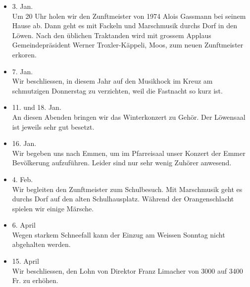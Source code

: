 \begin{multicols}{2}


    \begin{itemize}

        \item[]3. Jan.\\
        Um 20 Uhr holen wir den Zunftmeister von 1974 Alois Gassmann bei seinem
        Hause ab. Dann geht es mit Fackeln und Marschmusik durchs Dorf in den
        Löwen. Nach den üblichen Traktanden wird mit grossem Applaus
        Gemeindepräsident Werner Troxler-Käppeli, Moos, zum neuen Zunftmeister
        erkoren.

        \item[]7. Jan.\\
        Wir beschliessen, in diesem Jahr auf den Musikhock im Kreuz am
        schmutzigen Donnerstag zu verzichten, weil die Fastnacht so kurz ist.

        \item[]11. und 18. Jan.\\
        An diesen Abenden bringen wir das Winterkonzert zu Gehör. Der Löwensaal
        ist jeweils sehr gut besetzt.

        \item[]16. Jan.\\
        Wir begeben uns nach Emmen, um im Pfarreisaal unser Konzert der Emmer
        Bevölkerung aufzuführen. Leider sind nur sehr wenig Zuhörer anwesend.

        \item[]4. Feb.\\
        Wir begleiten den Zunftmeister zum Schulbesuch. Mit Marschmusik geht es
        durchs Dorf auf den alten Schulhausplatz. Während der Orangenschlacht
        spielen wir einige Märsche.

        \item[]6. April\\
        Wegen starkem Schneefall kann der Einzug am Weissen Sonntag nicht
        abgehalten werden.

        \item[]15. April\\
        Wir beschliessen, den Lohn von Direktor Franz Limacher von 3000 auf 3400
        Fr. zu erhöhen.


\end{itemize}
\end{multicols}
